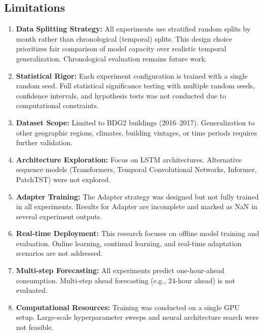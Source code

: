 \documentclass[12pt,a4paper]{report}
\begin{document}
\subsection{Limitations}

\begin{enumerate}
    \item \textbf{Data Splitting Strategy:} All experiments use stratified random splits by month rather than chronological (temporal) splits. This design choice prioritizes fair comparison of model capacity over realistic temporal generalization. Chronological evaluation remains future work.
    
    \item \textbf{Statistical Rigor:} Each experiment configuration is trained with a single random seed. Full statistical significance testing with multiple random seeds, confidence intervals, and hypothesis tests was not conducted due to computational constraints.
    
    \item \textbf{Dataset Scope:} Limited to BDG2 buildings (2016--2017). Generalization to other geographic regions, climates, building vintages, or time periods requires further validation.
    
    \item \textbf{Architecture Exploration:} Focus on LSTM architectures. Alternative sequence models (Transformers, Temporal Convolutional Networks, Informer, PatchTST) were not explored.
    
    \item \textbf{Adapter Training:} The Adapter strategy was designed but not fully trained in all experiments. Results for Adapter are incomplete and marked as NaN in several experiment outputs.
    
    \item \textbf{Real-time Deployment:} This research focuses on offline model training and evaluation. Online learning, continual learning, and real-time adaptation scenarios are not addressed.
    
    \item \textbf{Multi-step Forecasting:} All experiments predict one-hour-ahead consumption. Multi-step ahead forecasting (e.g., 24-hour ahead) is not evaluated.
    
    \item \textbf{Computational Resources:} Training was conducted on a single GPU setup. Large-scale hyperparameter sweeps and neural architecture search were not feasible.
\end{enumerate}
\end{document}
